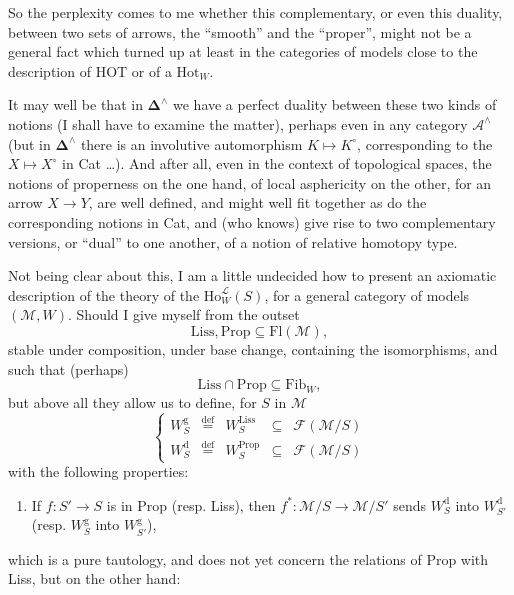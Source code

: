 \documentclass[11pt]{article}
\newcommand{\printedpage}[1]{\marginpar{\footnotesize p.~#1}}
\newcommand{\msp}[1]{\marginpar{\footnotesize [#1]}}
\newcommand{\circled}[1]{\tikz[baseline=(c.base)]\node[draw,circle,inner sep=1pt](c){#1};}
\newcommand{\deff}{\overset{\text{def}}{=}}
\begin{document}
So the perplexity comes to me whether this complementary, or even this duality, between two sets of arrows, the ``smooth'' and the ``proper'', might not be a general fact which turned up at least in the categories of models close to the description of HOT or of a $\mathrm{Hot}_W$.

\msp{page 225}

It may well be that in $\boldsymbol{\Delta}^\wedge$ we have a perfect duality between these two kinds of notions (I shall have to examine the matter), perhaps even in any category $\mathcal{A}^\wedge$ (but in $\boldsymbol{\Delta}^\wedge$ there is an involutive automorphism $K \longmapsto K^\circ$, corresponding to the $X \longmapsto X^\circ$ in Cat \dots). And after all, even in the context of topological spaces, the notions of properness on the one hand, of local asphericity on the other, for an arrow $X \longrightarrow Y$, are well defined, and might well fit together as do the corresponding notions in Cat, and (who knows) give rise to two complementary versions, or ``dual'' to one another, of a notion of relative homotopy type.

Not being clear about this, I am a little undecided how to present an axiomatic description of the theory of the $\mathrm{Ho}^{\mathcal{L}}_W(S)$, for a general category of models $(\mathcal{M},W)$. Should I give myself from the outset
\[
\mathrm{Liss}, \mathrm{Prop} \subseteq \mathrm{Fl}(\mathcal{M}),
\]
stable under composition, under base change, containing the isomorphisms, and such that (perhaps)
\[
\mathrm{Liss} \cap \mathrm{Prop} \subseteq \mathrm{Fib}_W,
\]
\msp{page 226}
but above all they allow us to define, for $S$ in $\mathcal{M}$
\[
\left\{
\begin{array}{lcccl}
W^{\mathrm{g}}_S & \deff & W^{\mathrm{Liss}}_S & \subseteq & \mathcal{F}(\mathcal{M}/S)\\
W^{\mathrm{d}}_S & \deff & W^{\mathrm{Prop}}_S & \subseteq & \mathcal{F}(\mathcal{M}/S)
\end{array}
\right.
\]
with the following properties:

\begin{enumerate}
\item[{\circled{a}}] If $f : S' \longrightarrow S$ is in Prop (resp. Liss), then $f^* : \mathcal{M}/S \longrightarrow \mathcal{M}/S'$ sends $W^{\mathrm{d}}_S$ into $W^{\mathrm{d}}_{S'}$ (resp. $W^{\mathrm{g}}_S$ into $W^{\mathrm{g}}_{S'}$),
\end{enumerate}
\printedpage{144}
\noindent which is a pure tautology, and does not yet concern the relations of Prop with Liss, but on the other hand:
\end{document}
